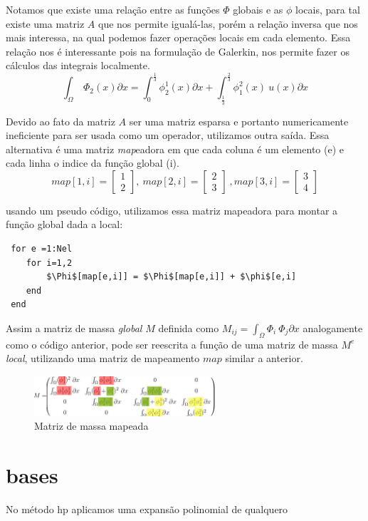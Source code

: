 Notamos que existe uma relação entre as funções  $\Phi$ globais e as $\phi$ locais, para tal existe uma matriz $A$ que nos permite igualá-las, porém a relação inversa que nos mais interessa, na qual podemos fazer operações locais em cada elemento. Essa relação nos é interessante pois na formulação de Galerkin, nos permite fazer os cálculos das integrais localmente.
\begin{equation}
\int_\Omega\ \Phi_2(x) \partial x = \int_{0}^{\frac{1}{3}} \phi^1_2(x) \partial x + \int_{\frac{1}{3}}^{\frac{2}{3}} \phi^2_1(x)\ u(x) \partial x
\end{equation}

Devido ao fato da matriz $A$ ser uma matriz esparsa e portanto numericamente ineficiente para ser usada como um operador, utilizamos outra saída. Essa alternativa é uma matriz \emph{map}eadora em que cada coluna é um elemento (e) e cada linha o indice da função global (i).
\begin{equation}
map[1,i]= \begin{bmatrix}
1\\
2
\end{bmatrix},\
map[2,i]= \begin{bmatrix}
2\\
3
\end{bmatrix}\
,map[3,i]= \begin{bmatrix}
3\\
4
\end{bmatrix}
\end{equation}

usando um pseudo código, utilizamos essa matriz mapeadora para montar a função global dada a local:
\begin{lstlisting}
 for e =1:Nel
 	for i=1,2
 		$\Phi$[map[e,i]] = $\Phi$[map[e,i]] + $\phi$[e,i]
 	end
 end
\end{lstlisting}
Assim a matriz de massa \emph{global} $M$ definida como $M_{ij} = \int_\Omega \Phi_i\ \Phi_j \partial x$ analogamente como  o código anterior, pode ser reescrita a função de uma matriz de massa $M^e$ \emph{local}, utilizando uma matriz de mapeamento $map$ similar a anterior.
\begin{figure}[!h]
\includegraphics[width=0.6\textwidth, center ]{figuras/Matrix_element.png}
\caption{Matriz de massa mapeada}
\end{figure}
\section{bases}
 No método hp aplicamos uma expansão polinomial de qualquero